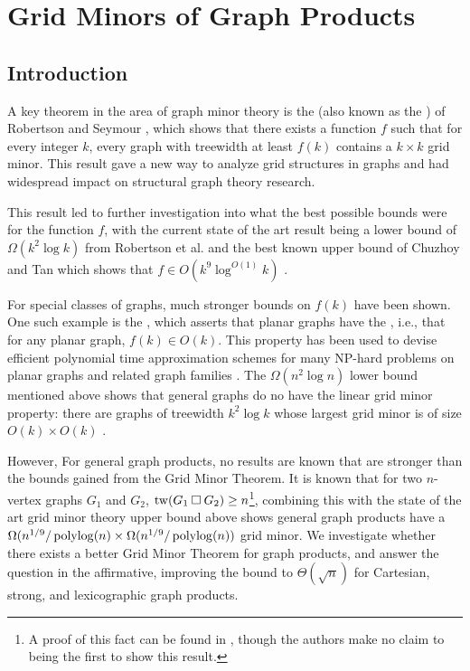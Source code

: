\documentclass[../main.tex]{subfiles}
\begin{document}
	\section{Grid Minors of Graph Products}
	\subsection{Introduction}
	A key theorem in the area of graph minor theory is the  (also known as the ) of Robertson and Seymour \cite{RS-V}, which shows that there exists a function $f$ such that for every integer $k$, every graph with treewidth at least $f(k)$ contains a $k \times k$ grid minor. This result gave a new way to analyze grid structures in graphs and had widespread impact on structural graph theory research.
	
	This result led to further investigation into what the best possible bounds were for the function $f$, with the current state of the art result being a lower bound of $\Omega(k^2\log k)$ from Robertson et al. \cite{RST-JCTB94} and the best known upper bound of Chuzhoy and Tan which shows that $f \in O(k^9\log^{O(1)}k)$ \cite{CT21}.
	
	For special classes of graphs, much stronger bounds on $f(k)$ have been shown. One such example is the , which asserts that planar graphs have the , i.e., that for any planar graph, $f(k) \in O(k)$.  This property has been used to devise efficient polynomial time approximation schemes for many NP-hard problems on planar graphs and related graph families \cite{DHK-Algo09,DFHT-JACM05,DH-Algo04, Eppstein-Algo00, FFLS18}. The $\Omega(n^2\log n)$ lower bound mentioned above shows that general graphs do no have the linear grid minor property: there are graphs of treewidth $k^2\log k$ whose largest grid minor is of size $O(k)\times O(k)$ \cite{RST-JCTB94}.
	
	However, For general graph products, no results are known that are stronger than the bounds gained from the Grid Minor Theorem. It is known that for two $n$-vertex graphs $G_1$ and $G_2$, $\operatorname{tw}(G_1 \mathbin{\Box} G_2) \ge n$\footnote{A proof of this fact can be found in \cite{DMWW24}, though the authors make no claim to being the first to show this result.}, combining this with the state of the art grid minor theory upper bound above shows general graph products have a $\Omega(n^{1/9}/\operatorname{polylog}(n) \times \Omega(n^{1/9}/\operatorname{polylog}(n))$ grid minor. We investigate whether there exists a better Grid Minor Theorem for graph products, and answer the question in the affirmative, improving the bound to $\Theta(\sqrt{n})$ for Cartesian, strong, and lexicographic graph products.
	
\end{document}
